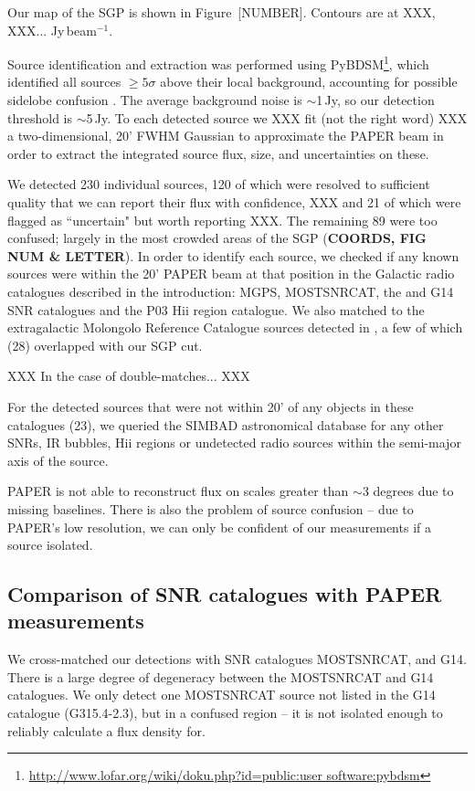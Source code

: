 \documentclass[useAMS,usenatbib]{mn2e}
\begin{document}
Our map of the SGP is shown in Figure~{\color{red}[NUMBER]}. Contours are at XXX, XXX... Jy\,beam$^{-1}$. 

Source identification and extraction was performed using PyBDSM\footnote{\url{http://www.lofar.org/wiki/doku.php?id=public:user software:pybdsm}}, which identified all sources $\geq5\sigma$ above their local background, accounting for possible sidelobe confusion \citep{PyBDSM.15}. The average background noise is $\sim$1\,Jy, so our detection threshold is $\sim$5\,Jy. To each detected source we XXX fit (not the right word) XXX a two-dimensional, 20' FWHM Gaussian to approximate the PAPER beam \citep{Parsons.10} in order to extract the integrated source flux, size, and uncertainties on these. 

We detected 230 individual sources, 120 of which were resolved to sufficient quality that we can report their flux with confidence, XXX and 21 of which were flagged as ``uncertain" but worth reporting XXX. The remaining 89 were too confused; largely in the most crowded areas of the SGP ({\bf COORDS, FIG NUM \& LETTER}). In order to identify each source, we checked if any known sources were within the 20' PAPER beam at that position in the Galactic radio catalogues described in the introduction: MGPS, MOSTSNRCAT, the \cite{AGreen.14} and G14 SNR catalogues and the P03 H{\sc ii} region catalogue. We also matched to the extragalactic Molongolo Reference Catalogue \citep[MRC;][]{Large.81} sources detected in \cite{Jacobs.11}, a few of which (28) overlapped with our SGP cut. 

XXX In the case of double-matches... XXX

For the detected sources that were not within 20' of any objects in these catalogues (23), we queried the SIMBAD astronomical database \citep{Wegner.00} for any other SNRs,  IR bubbles, H{\sc ii} regions or undetected radio sources within the semi-major axis of the source.

PAPER is not able to reconstruct flux on scales greater than $\sim3$ degrees due to missing baselines.  There is also the problem of source confusion -- due to PAPER's low resolution, we can only be confident of our measurements if a source isolated.

\subsection{Comparison of SNR catalogues with PAPER measurements}
\label{subsec:G14}

We cross-matched our detections with SNR catalogues MOSTSNRCAT, \cite{AGreen.14} and G14. There is a large degree of degeneracy between the MOSTSNRCAT and G14 catalogues. We only detect one MOSTSNRCAT source not listed in the G14 catalogue (G315.4-2.3), but in a confused region -- it is not isolated enough to reliably calculate a flux density for. 
\end{document}
